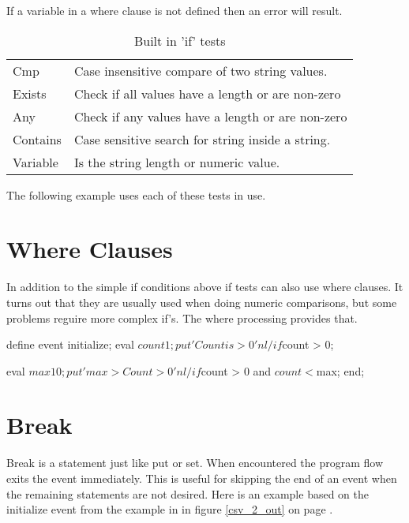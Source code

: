 If a variable in a where clause is not defined then an error
will result.

\begin{table}\caption{Built in 'if' tests}
\label{builtin_ifs}
\begin{tabular}{l|l}\\ \hline
Cmp &  Case insensitive compare of two string values.\\
Exists & Check if all values have a length or are non-zero\\
Any & Check if any values have a length or are non-zero\\
Contains & Case sensitive search for string inside a string.\\
Variable & Is the string length or numeric value.
\end{tabular}
\end{table}

The following example uses each of these tests in use.


\section{Where Clauses}
In addition to the simple if conditions
above if tests can also use where clauses.  It turns out that they
are usually used when doing numeric comparisons, but some problems reguire
more complex if's.  The where processing provides that.

\begin{sfvcode}
        define event initialize;
           eval $count 1;
           put 'Count is > 0' nl /if $count > 0;

           eval $max 10;
           put 'max > Count > 0 ' nl /if $count > 0 and $count < $max;
        end;
\end{sfvcode}


\section{Break}
Break is a statement just like put or set.  When encountered the program
flow exits the event immediately.  This is useful for skipping the end
of an event when the remaining statements are not desired.  Here is an
example based on the initialize event from the example in in 
figure \ref{csv_2_out} on page \pageref{csv_2_out}.

